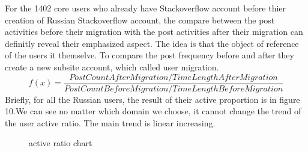 \documentclass[A4paper,twoside,twocolumn]{article}
\begin{document}
For the 1402 core users who already have Stackoverflow account before thier creation of Russian Stackoverflow account, the compare between the post activities before their migration with the post activities after their migration can definitly reveal their emphasized aspect.	The idea is that the object of reference of the users it themselve. To compare the post frequency before and after they create a new subsite account, which called user migration.
	\begin{displaymath}
	f(x)=\frac{PostCountAfterMigration/TimeLengthAfterMigration  }{  PostCountBeforeMigration /TimeLengthBeforeMigration}	 			\end{displaymath}
Briefly, for all the Russian users, the result of their active proportion is in figure 10.We can see no matter which domain we choose, it cannot change the trend of the user active ratio. The main trend is linear increasing.
 \begin{figure}[H]
 		\centering 
	\caption{active ratio chart}
	\label{fig} 
  	\end{figure}
\end{document}
